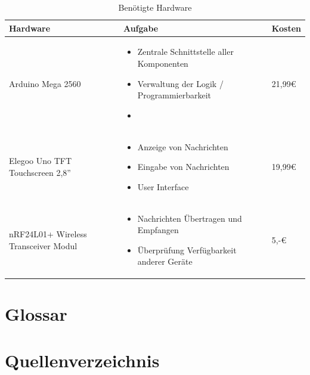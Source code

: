 \documentclass[a4paper, 11pt]{scrartcl}
\begin{document}
\begin{table}[H]
    \caption{Benötigte Hardware}\label{tab:hardware}
    \begin{tabular}{|p{}|p{}|p{}|}
        \hline
        \textbf{Hardware} & \textbf{Aufgabe} & \textbf{Kosten}
        \\
        \hline\hline
        Arduino Mega 2560 
        & 
        \begin{itemize}
            \item Zentrale Schnittstelle aller Komponenten
            \item Verwaltung der Logik / Programmierbarkeit
            \item 
        \end{itemize} 
        & 
        21,99€
        \\
        \hline
        Elegoo Uno TFT Touchscreen 2,8''
        &
        \begin{itemize}
            \item Anzeige von Nachrichten
            \item Eingabe von Nachrichten
            \item User Interface
        \end{itemize}
        &
        19,99€
        \\
        \hline
        nRF24L01+ Wireless Transceiver Modul
        &
        \begin{itemize}
            \item Nachrichten Übertragen und Empfangen
            \item Überprüfung Verfügbarkeit anderer Geräte
        \end{itemize}
        &
        5,-€
        \\
        \hline
    \end{tabular}
\end{table}


\newpage
\section{Glossar}
\section{Quellenverzeichnis}
\end{document}
